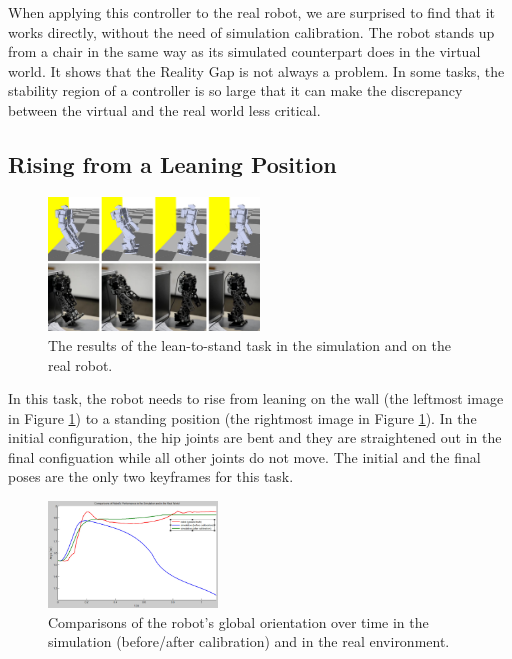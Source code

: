 When applying this controller to the real robot, we are surprised to find that it works directly, without the need of simulation calibration. The robot stands up from a chair in the same way as its simulated counterpart does in the virtual world. It shows that the Reality Gap is not always a problem. In some tasks, the stability region of a controller is so large that it can make the discrepancy between the virtual and the real world less critical.

\subsection{Rising from a Leaning Position}

\begin{figure}[!t]
  \centering
  \includegraphics[width=0.5\textwidth]{figures/lean2Stand}
  \caption{The results of the lean-to-stand task in the simulation and on the real robot.}
  \label{fig:lean2Stand}
\end{figure}

In this task, the robot needs to rise from leaning on the wall (the leftmost image in Figure \ref{fig:lean2Stand}) to a standing position (the rightmost image in Figure \ref{fig:lean2Stand}). In the initial configuration, the hip joints are bent and they are straightened out in the final configuation while all other joints do not move. The initial and the final poses are the only two keyframes for this task.

\begin{figure}[!t]
  \centering
  \includegraphics[width=0.4\textwidth]{figures/simRobotCompare}
  \caption{Comparisons of the robot's global orientation over time in the simulation (before/after calibration) and in the real environment.}
  \label{fig:simRobotCompare}
\end{figure}


